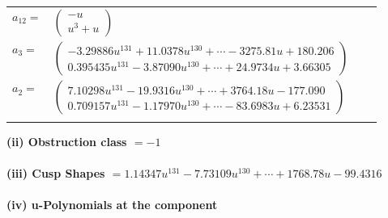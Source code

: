 \documentclass[1p]{elsarticle_modified}
\theoremstyle{definition}
\begin{document}
\begin{tabular}{m{7pt} m{180pt} m{7pt} m{180pt} }
\flushright $a_{12}=$&$\begin{pmatrix}- u\\u^3+u\end{pmatrix}$ \\
\flushright $a_{3}=$&$\begin{pmatrix}-3.29886 u^{131}+11.0378 u^{130}+\cdots-3275.81 u+180.206\\0.395435 u^{131}-3.87090 u^{130}+\cdots+24.9734 u+3.66305\end{pmatrix}$ \\
\flushright $a_{2}=$&$\begin{pmatrix}7.10298 u^{131}-19.9316 u^{130}+\cdots+3764.18 u-177.090\\0.709157 u^{131}-1.17970 u^{130}+\cdots-83.6983 u+6.23531\end{pmatrix}$\\&\end{tabular}
\flushleft \textbf{(ii) Obstruction class $= -1$}\\~\\
\flushleft \textbf{(iii) Cusp Shapes $= 1.14347 u^{131}-7.73109 u^{130}+\cdots+1768.78 u-99.4316$}\\~\\
\newpage\renewcommand{\arraystretch}{1}
\flushleft \textbf{(iv) u-Polynomials at the component}\newline \\
\end{document}
